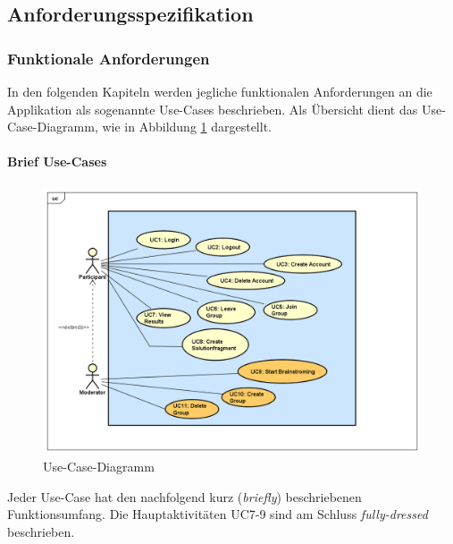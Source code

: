\subsection{Anforderungsspezifikation}

\subsubsection{Funktionale Anforderungen}
In den folgenden Kapiteln werden jegliche funktionalen Anforderungen an die Applikation als sogenannte Use-Cases beschrieben. Als Übersicht dient das Use-Case-Diagramm, wie in Abbildung \ref{fig:ucmethode-635} dargestellt.

\paragraph{Brief Use-Cases}

\begin{figure}[h]
	\centering
	\includegraphics[width=1\linewidth]{img/anforderungen/UC-Methode635}
	\caption{Use-Case-Diagramm}
	\label{fig:ucmethode-635}
\end{figure}

Jeder Use-Case hat den nachfolgend kurz (\textit{briefly}) beschriebenen  Funktionsumfang. Die Hauptaktivitäten UC7-9 sind am Schluss \textit{fully-dressed} beschrieben.

